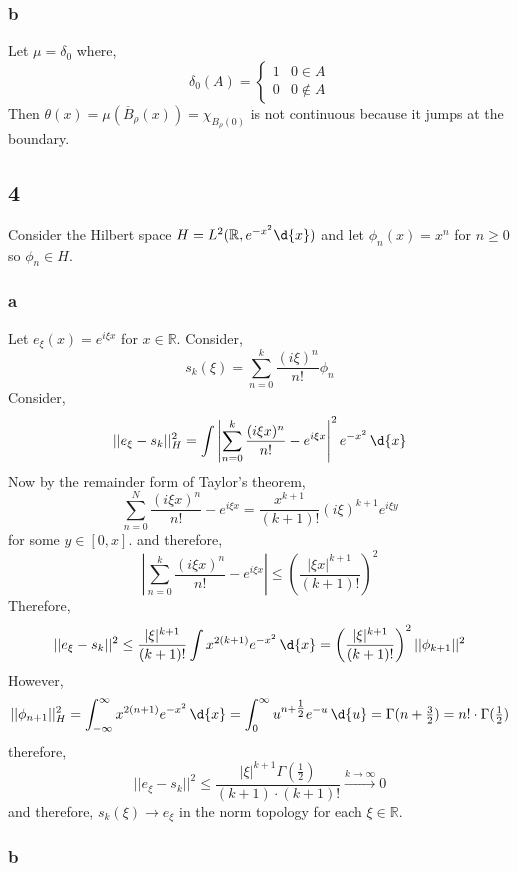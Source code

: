 \documentclass[12pt]{article}
\newcommand{\R}{\mathbb{R}}
\begin{document}
\subsubsection{b}

Let $\mu = \delta_0$ where,
\[ \delta_0(A) =
\begin{cases}
1 & 0 \in A 
\\
0 & 0 \notin A
\end{cases}\]
Then $\theta(x) = \mu(\overline{B}_\rho(x)) = \chi_{B_\rho(0)}$ is not continuous because it jumps at the boundary.

\subsection{4}

Consider the Hilbert space $H = L^2(\R, e^{-x^2} \d{x})$ and let $\phi_n(x) = x^n$ for $n \ge 0$ so $\phi_n \in H$.

\subsubsection{a}

Let $e_\xi(x) = e^{i \xi x}$ for $x \in \R$. Consider,
\[ s_k(\xi) = \sum_{n = 0}^k \frac{(i \xi)^n}{n!} \phi_n \]
Consider,
\begin{align*}
|| e_\xi - s_k ||^2_H = \int \left| \sum_{n = 0}^k \frac{(i \xi x)^n}{n!}  - e^{i \xi x} \right|^2 e^{-x^2} \, \d{x} 
\end{align*}
Now by the remainder form of Taylor's theorem,
\[ \sum_{n = 0}^N \frac{(i \xi x)^n}{n!}  - e^{i \xi x} = \frac{x^{k+1}}{(k+1)!} (i \xi)^{k+1} e^{i \xi y} \]
for some $y \in [0, x]$. and therefore,
\[ \left| \sum_{n = 0}^k \frac{(i \xi x)^n}{n!}  - e^{i \xi x} \right| \le \left( \frac{|\xi x|^{k+1}}{(k+1)!} \right)^2 \]
Therefore,
\[ || e_\xi - s_k ||^2 \le \frac{|\xi|^{k+1}}{(k + 1)!} \int x^{2(k+1)} e^{-x^2} \, \d{x} = \left( \frac{|\xi|^{k+1}}{(k + 1)!} \right)^2 || \phi_{k+1} ||^2 \]
However,
\[ ||\phi_{n+1}||^2_H = \int_{-\infty}^{\infty} x^{2(n+1)} e^{-x^2} \, \d{x} = \int_0^{\infty} u^{n + \tfrac{1}{2}} e^{-u} \, \d{u} = \Gamma(n + \tfrac{3}{2}) = n! \cdot \Gamma(\tfrac{1}{2}) \]
therefore,
\[ || e_\xi - s_k ||^2 \le \frac{|\xi|^{k + 1} \Gamma(\tfrac{1}{2})}{(k + 1) \cdot (k + 1)!} \xrightarrow{k \to \infty} 0 \]
and therefore, $s_k(\xi) \to e_\xi$ in the norm topology for each $\xi \in \R$.

\subsubsection{b}
\end{document}
